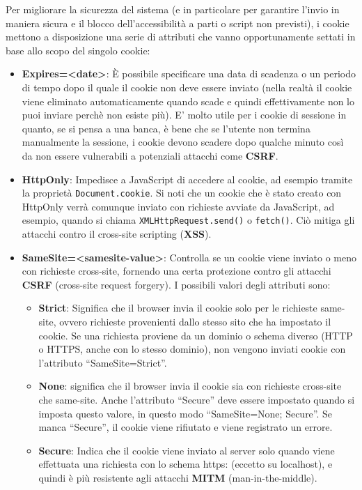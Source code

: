 Per migliorare la sicurezza del sistema (e in particolare per garantire l'invio in maniera sicura e il blocco dell'accessibilità a parti o script non previsti), i cookie mettono a disposizione una serie di attributi che vanno opportunamente settati in base allo scopo del singolo cookie:
\begin{itemize}
	\item \textbf{Expires=<date>}: È possibile specificare una data di scadenza o un periodo di tempo dopo il quale il cookie non deve essere inviato (nella realtà il cookie viene eliminato automaticamente quando scade e quindi effettivamente non lo puoi inviare perchè non esiste più). E' molto utile per i cookie di sessione in quanto, se si pensa a una banca, è bene che se l'utente non termina manualmente la sessione, i cookie devono scadere dopo qualche minuto così da non essere vulnerabili a potenziali attacchi come \textbf{CSRF}.
	\item \textbf{HttpOnly}: Impedisce a JavaScript di accedere al cookie, ad esempio tramite la proprietà \verb|Document.cookie|. Si noti che un cookie che è stato creato con HttpOnly verrà comunque inviato con richieste avviate da JavaScript, ad esempio, quando si chiama \verb|XMLHttpRequest.send()| o \verb|fetch()|. Ciò mitiga gli attacchi contro il cross-site scripting (\textbf{XSS}).
	\item \textbf{SameSite=<samesite-value>}: Controlla se un cookie viene inviato o meno con richieste cross-site, fornendo una certa protezione contro gli attacchi \textbf{CSRF} (cross-site request forgery). I possibili valori degli attributi sono:
	\begin{itemize}
		\item \textbf{Strict}: Significa che il browser invia il cookie solo per le richieste same-site, ovvero richieste provenienti dallo stesso sito che ha impostato il cookie. Se una richiesta proviene da un dominio o schema diverso (HTTP o HTTPS, anche con lo stesso dominio), non vengono inviati cookie con l'attributo ``SameSite=Strict''.
		\item \textbf{None}: significa che il browser invia il cookie sia con richieste cross-site che same-site. Anche l'attributo ``Secure'' deve essere impostato quando si imposta questo valore, in questo modo ``SameSite=None; Secure''. Se manca ``Secure'', il cookie viene rifiutato e viene registrato un errore.
		\item \textbf{Secure}: Indica che il cookie viene inviato al server solo quando viene effettuata una richiesta con lo schema https: (eccetto su localhost), e quindi è più resistente agli attacchi \textbf{MITM} (man-in-the-middle).
	\end{itemize}
\end{itemize}

